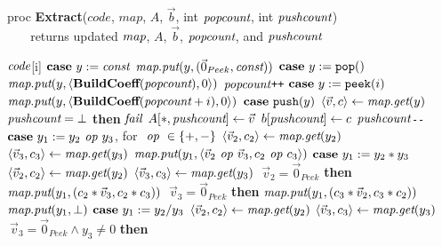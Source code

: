 \begin{algorithm}
proc {\bf Extract}($code$, $map$, $A$, $\vec b$, int $\mbox{\it popcount}$, int $\mbox{\it pushcount}$) \\
\verb+   + returns updated $\mbox{\it map}$, $A$, ${\vec b}$, $\mbox{\it popcount}$, and $\mbox{\it pushcount}$ \\ \vspace{-12pt}
\begin{algorithmic}
 $\mbox{\it code}$[i]
\IND
\STATE $\mbox{\bf case}~y := \mbox{\it const}$
\IND
\STATE $\mbox{\it map}.\mbox{\it put}(y, (\vec 0_{Peek}, \mbox{\it const}))$
\UND
\STATE \vspace{-6pt}
\STATE $\mbox{\bf case}~y := \mbox{\tt pop}()$
\IND
\STATE $\mbox{\it map}.\mbox{\it put}(y, \langle{\mbox{\bf BuildCoeff}(\mbox{\it popcount})}, {0}\rangle)$
\STATE $\mbox{\it popcount}$\verb|++|
\UND
\STATE \vspace{-6pt}
\STATE $\mbox{\bf case}~y := \mbox{\tt peek}(i)$
\IND
\STATE $\mbox{\it map}.\mbox{\it put}(y, \langle{\mbox{\bf BuildCoeff}(\mbox{\it popcount}+i)}, {0}\rangle)$
\UND
\STATE \vspace{-6pt}
\STATE $\mbox{\bf case}~\mbox{\tt push}(y)$
\IND
\STATE $\langle{\vec v}, {c}\rangle \leftarrow \mbox{\it map}.\mbox{\it get}(y)$
 $\mbox{\it pushcount} = \bot$ {\bf then} $\mbox{\it fail}$
\STATE $A[*, \mbox{\it pushcount}] \leftarrow \vec v$
\STATE $b[\mbox{\it pushcount}] \leftarrow c$
\STATE $\mbox{\it pushcount}$\verb|--|
\UND
\STATE \vspace{-6pt}
\STATE $\mbox{\bf case}~ y_1 := y_2 \mbox{\it ~op~} y_3$, for $\mbox{\it ~op~} \in \{+, -\}$
\IND
\STATE $\langle{\vec v_2}, {c_2}\rangle \leftarrow \mbox{\it map}.\mbox{\it get}(y_2)$
\STATE $\langle{\vec v_3}, {c_3}\rangle \leftarrow \mbox{\it map}.\mbox{\it get}(y_3)$
\STATE $\mbox{\it map}.\mbox{\it put}(y_1, \langle{\vec v_2 \mbox{\it ~op~} \vec v_3}, {c_2 \mbox{\it ~op~} c_3}\rangle)$
\UND
\STATE \vspace{-6pt}
\STATE $\mbox{\bf case}~y_1 := y_2 * y_3$
\IND
\STATE $\langle{\vec v_2}, {c_2}\rangle \leftarrow \mbox{\it map}.\mbox{\it get}(y_2)$
\STATE $\langle{\vec v_3}, {c_3}\rangle \leftarrow \mbox{\it map}.\mbox{\it get}(y_3)$
 $~\vec v_2 = \vec 0_{Peek}$ {\bf then}
\IND
\STATE $\mbox{\it map}.\mbox{\it put}(y_1, (c_2*\vec v_3, c_2*c_3))$
\UND
{} $~\vec v_3=\vec 0_{Peek}$ {\bf then}
\IND
\STATE $\mbox{\it map}.\mbox{\it put}(y_1, (c_3*\vec v_2, c_3*c_2))$
\UND
{}
\IND
\STATE $\mbox{\it map}.\mbox{\it put}(y_1, \bot)$
\UND
\UND
\STATE \vspace{-6pt}
\STATE $\mbox{\bf case}~y_1 := y_2 / y_3$
\IND
\STATE $\langle{\vec v_2}, {c_2}\rangle \leftarrow \mbox{\it map}.\mbox{\it get}(y_2)$
\STATE $\langle{\vec v_3}, {c_3}\rangle \leftarrow \mbox{\it map}.\mbox{\it get}(y_3)$
 $~\vec v_3 = \vec 0_{Peek} \wedge y_3 \ne 0$ {\bf then}

\end{algorithmic}
\end{algorithm}

